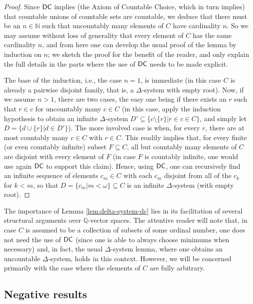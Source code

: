 \documentclass[10pt,a4paper]{amsart}
\theoremstyle{definition}
\newcommand{\dc}{\mathnormal{\mathsf{DC}}}
\theoremstyle{remark}
\numberwithin{equation}{section}
\begin{document}
\begin{proof}
    Since $\dc$ implies (the Axiom of Countable Choice, which in turn implies) that countable unions of countable sets are countable, we deduce that there must be an $n\in\mathbb N$ such that uncountably many elements of $C$ have cardinality $n$. So we may assume without loss of generality that every element of $C$ has the same cardinality $n$, and from here one can develop the usual proof of the lemma by induction on $n$; we sketch the proof for the benefit of the reader, and only explain the full details in the parts where the use of $\dc$ needs to be made explicit.

    The base of the induction, i.e., the case $n=1$, is immediate (in this case $C$ is already a pairwise disjoint family, that is, a $\Delta$-system with empty root). Now, if we assume $n>1$, there are two cases, the easy one being if there exists an $r$ such that $r\in c$ for uncountably many $c\in C$ (in this case, apply the induction hypothesis to obtain an infinite $\Delta$-system $D'\subseteq\{c\setminus\{r\}\big|r\in c\in C\}$, and simply let $D=\{d\cup\{r\}\big|d\in D'\}$). The more involved case is when, for every $r$, there are at most countably many $c\in C$ with $r\in C$. This readily implies that, for every finite (or even countably infinite) subset $F\subseteq C$, all but countably many elements of $C$ are disjoint with every element of $F$ (in case $F$ is countably infinite, one would use again $\dc$ to support this claim). Hence, using $\dc$, one can recursively find an infinite sequence of elements $c_m\in C$ with each $c_m$ disjoint from all of the $c_k$ for $k<m$, so that $D=\{c_m\big|m<\omega\}\subseteq C$ is an infinite $\Delta$-system (with empty root).
\end{proof}


The importance of Lemma \ref{lem:delta-system-dc} lies in its facilitation of several structural arguments over $\mathbb Q$-vector spaces. The attentive reader will note that, in case $C$ is assumed to be a collection of subsets of some ordinal number, one does not need the use of $\dc$ (since one is able to always choose minimums when necessary) and, in fact, the usual $\Delta$-system lemma, where one obtains an uncountable $\Delta$-system, holds in this context. However, we will be concerned primarily with the case where the elements of $C$ are fully arbitrary.

\subsection{Negative results}\label{subsec:hindman-failures}
\end{document}
